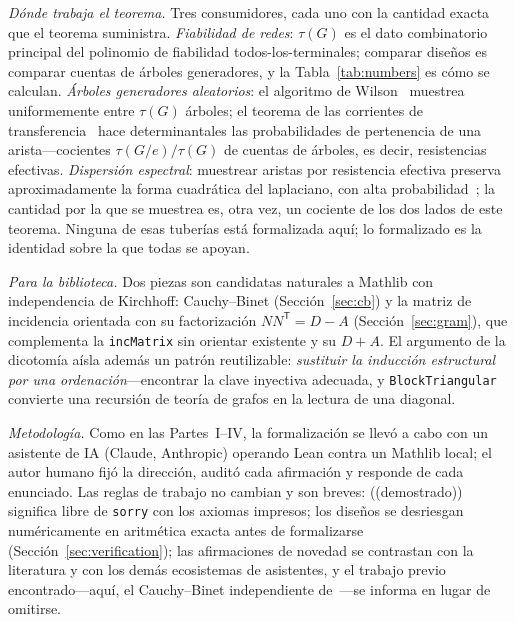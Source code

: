 \documentclass[11pt]{article}
\newcommand{\lean}[1]{\texttt{#1}}
\begin{document}
\emph{D\'onde trabaja el teorema.} Tres consumidores, cada uno con la cantidad exacta que el
teorema suministra. \emph{Fiabilidad de redes}: $\tau(G)$ es el dato combinatorio principal del
polinomio de fiabilidad todos-los-terminales; comparar dise\~nos es comparar cuentas de
\'arboles generadores, y la Tabla~\ref{tab:numbers} es c\'omo se calculan. \emph{\'Arboles
generadores aleatorios}: el algoritmo de Wilson~\cite{Wilson1996} muestrea uniformemente entre
$\tau(G)$ \'arboles; el teorema de las corrientes de transferencia~\cite{BurtonPemantle1993}
hace determinantales las probabilidades de pertenencia de una arista---cocientes
$\tau(G/e)/\tau(G)$ de cuentas de \'arboles, es decir, resistencias efectivas.
\emph{Dispersi\'on espectral}: muestrear aristas por resistencia efectiva preserva
aproximadamente la forma cuadr\'atica del laplaciano, con alta
probabilidad~\cite{SpielmanSrivastava2011}; la cantidad por la que se muestrea es, otra vez,
un cociente de los dos lados de este teorema. Ninguna de esas tuber\'ias est\'a formalizada
aqu\'i; lo formalizado es la identidad sobre la que todas se apoyan.

\emph{Para la biblioteca.} Dos piezas son candidatas naturales a Mathlib con independencia de
Kirchhoff: Cauchy--Binet (Secci\'on~\ref{sec:cb}) y la matriz de incidencia orientada con su
factorizaci\'on $NN^{\mathsf T}=D-A$ (Secci\'on~\ref{sec:gram}), que complementa la
\lean{incMatrix} sin orientar existente y su $D+A$. El argumento de la dicotom\'ia a\'isla
adem\'as un patr\'on reutilizable: \emph{sustituir la inducci\'on estructural por una
ordenaci\'on}---encontrar la clave inyectiva adecuada, y \lean{BlockTriangular} convierte una
recursi\'on de teor\'ia de grafos en la lectura de una diagonal.

\emph{Metodolog\'ia.} Como en las Partes~I--IV, la formalizaci\'on se llev\'o a cabo con un
asistente de IA (Claude, Anthropic) operando Lean contra un Mathlib local; el autor humano
fij\'o la direcci\'on, audit\'o cada afirmaci\'on y responde de cada enunciado. Las reglas de
trabajo no cambian y son breves: ((demostrado)) significa libre de \lean{sorry} con los axiomas
impresos; los dise\~nos se desriesgan num\'ericamente en aritm\'etica exacta antes de
formalizarse (Secci\'on~\ref{sec:verification}); las afirmaciones de novedad se contrastan con
la literatura y con los dem\'as ecosistemas de asistentes, y el trabajo previo
encontrado---aqu\'i, el Cauchy--Binet independiente de~\cite{FaabianRepo}---se informa en lugar
de omitirse.

\end{document}
